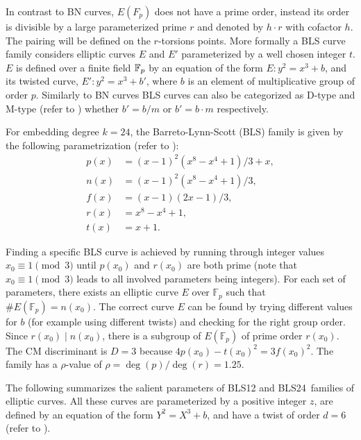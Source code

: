In contrast to BN curves, $E(F_p)$ does not have a prime order, instead its order is divisible by a large parameterized prime $r$ and denoted by $h \cdot r$ with cofactor $h$. The pairing will be defined on the $r$-torsions points. More formally a BLS curve family considers elliptic curves $E$ and $E'$ parameterized by a well chosen integer $t$. $E$ is defined over a finite field $\mathbb{F}_p$ by an equation of the form $E: y^2 = x^3 + b$, and its twisted curve, $E': y^2 = x^3 + b'$, where $b$ is an element of multiplicative group of order $p$.
Similarly to BN curves BLS curves can also be categorized as D-type and M-type (refer to \cite{ecc.pairing.curves.bls}) whether $b' = b / m$ or $b' = b \cdot m$ respectively. 


For embedding degree $k = 24$, the Barreto-Lynn-Scott (BLS) family is given by the following parametrization (refer to \cite{CLN11}):
\begin{align*}
	p(x) &= (x-1)^2(x^8 - x^4 + 1)/3 + x,\\
	n(x) &= (x-1)^2(x^8 - x^4 + 1)/3,\\
	f(x) &= (x-1)(2x-1)/3,\\
	r(x) &= x^8 - x^4 + 1,\\
	t(x) &= x + 1.
\end{align*}


Finding a specific BLS curve is achieved by running through integer values $x_0 \equiv 1 \pmod{3}$ until $p(x_0)$ and $r(x_0)$ are both prime (note that $x_0 \equiv 1 \pmod{3}$ leads to all involved parameters being integers). For each set of parameters, there exists an elliptic curve $E$ over $\mathbb{F}_p$ such that $\#E(\mathbb{F}_p) = n(x_0)$. The correct curve $E$ can be found by trying different values for $b$ (for example using different twists) and checking for the right group order. Since $r(x_0) \mid n(x_0)$, there is a subgroup of $E(\mathbb{F}_p)$ of prime order $r(x_0)$. The CM discriminant is $D = 3$ because $4p(x_0) - t(x_0)^2 = 3f(x_0)^2$. The family has a $\rho$-value of $\rho = \deg(p)/\deg(r) = 1.25$.

The following   summarizes the salient parameters of BLS12 and BLS24~families of elliptic curves. All these curves are parameterized by a positive integer $z$, are defined by an equation of the form $Y^2 = X^3 + b$, and have a twist of order $d = 6$ (refer to ). 

